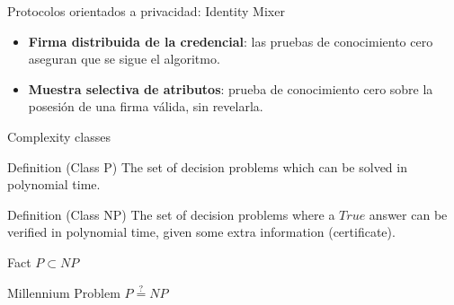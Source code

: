 \documentclass{beamer}
\begin{document}
\begin{frame}{Protocolos orientados a privacidad: Identity Mixer}	
	\begin{itemize}
		\item \textbf{Firma distribuida de la credencial}: las pruebas de conocimiento cero aseguran que se sigue el algoritmo.
		\item \textbf{Muestra selectiva de atributos}: prueba de conocimiento cero sobre la posesión de una firma válida, sin revelarla.
	\end{itemize}
\end{frame}





\maketitle


\appendix





\begin{frame}{Complexity classes}

\begin{block}{Definition (Class P)}
	The set of decision problems which can be solved in polynomial time.
\end{block}

\begin{block}{Definition (Class NP)}
	The set of decision problems where a $True$ answer can be verified in polynomial time, given some extra information (certificate).
\end{block}

\begin{block}{Fact}
	$P\subset NP$
\end{block}

\begin{block}{Millennium Problem}
	$P\overset{?}{=} NP$ %
\end{block}


\end{frame}
\end{document}
